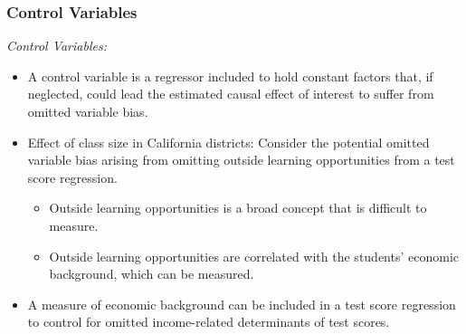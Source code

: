

\begin{frame}
\frametitle{Control Variables}
\emph{Control Variables:}
\begin{itemize}
\item A control variable is a regressor included to hold constant factors that, if neglected, could lead the estimated causal effect of interest to suffer from omitted variable bias. 
\item Effect of class size in California districts: 
Consider the potential omitted variable bias arising from omitting outside learning opportunities from a test score regression. 
\begin{itemize}
\item Outside learning opportunities is a broad concept that is difficult to measure. 
\item Outside learning opportunities are correlated with the students' economic background, which can be measured.
\end{itemize}
\item A measure of economic background can be included in a test score regression to control for omitted income-related determinants of test scores. 
\end{itemize}
\end{frame}


